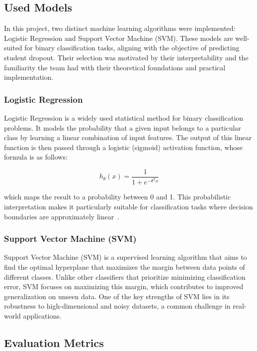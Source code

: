 \documentclass[runningheads]{llncs}
\begin{document}
\subsection{Used Models}

In this project, two distinct machine learning algorithms were implemented: Logistic Regression and Support Vector Machine (SVM). These models are well-suited for binary classification tasks, aligning with the objective of predicting student dropout. Their selection was motivated by their interpretability and the familiarity the team had with their theoretical foundations and practical implementation. 

\subsubsection{Logistic Regression}

Logistic Regression is a widely used statistical method for binary classification problems. It models the probability that a given input belongs to a particular class by learning a linear combination of input features. The output of this linear function is then passed through a logistic (sigmoid) activation function, whose formula is as follows:

\begin{equation}
h_{\theta}(x) = \frac{1}{1 + e^{-\theta^T x}}
\end{equation}

which maps the result to a probability between 0 and 1. This probabilistic interpretation makes it particularly suitable for classification tasks where decision boundaries are approximately linear~\cite{Zaidi2023Two}.

\subsubsection{Support Vector Machine (SVM)}

Support Vector Machine (SVM) is a supervised learning algorithm that aims to find the optimal hyperplane that maximizes the margin between data points of different classes. Unlike other classifiers that prioritize minimizing classification error, SVM focuses on maximizing this margin, which contributes to improved generalization on unseen data. One of the key strengths of SVM lies in its robustness to high-dimensional and noisy datasets, a common challenge in real-world applications\cite{10426542}.

\subsection{Evaluation Metrics}
\end{document}
